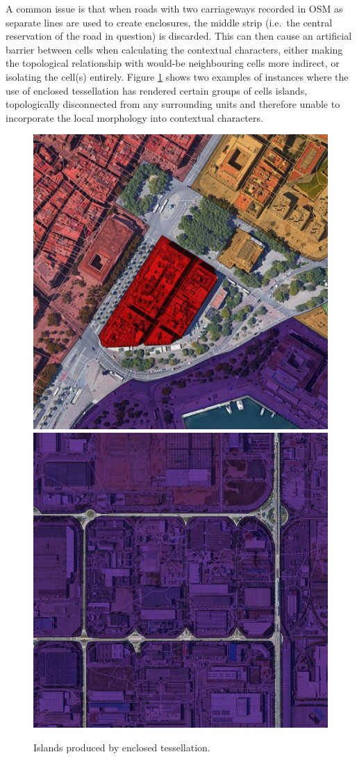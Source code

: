 \documentclass[a4paper, nobind]{templates/ociamthesis}
\begin{document}
A common issue is that when roads with two carriageways recorded in OSM as separate lines are used to create enclosures, the middle strip (i.e.~the central reservation of the road in question) is discarded. This can then cause an artificial barrier between cells when calculating the contextual characters, either making the topological relationship with would-be neighbouring cells more indirect, or isolating the cell(s) entirely. Figure \ref{fig:ET-islands} shows two examples of instances where the use of enclosed tessellation has rendered certain groups of cells islands, topologically disconnected from any surrounding units and therefore unable to incorporate the local morphology into contextual characters.

\begin{figure}

{\centering \includegraphics[width=0.48\linewidth]{figures/islands1 square} \includegraphics[width=0.48\linewidth]{figures/islands2 square} 

}

\caption[Islands produced by enclosed tessellation.]{Islands produced by enclosed tessellation.}\label{fig:ET-islands}
\end{figure}
\end{document}
